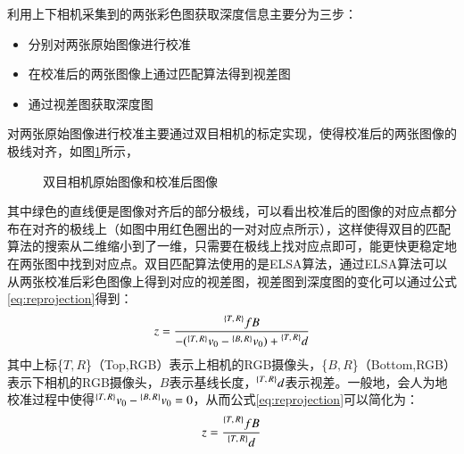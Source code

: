 利用上下相机采集到的两张彩色图获取深度信息主要分为三步：
\begin{itemize}
\item 分别对两张原始图像进行校准
\item 在校准后的两张图像上通过匹配算法得到视差图
\item 通过视差图获取深度图
\end{itemize}
对两张原始图像进行校准主要通过双目相机的标定实现，使得校准后的两张图像的极线对齐，如图\ref{fig:stereo_images}所示，
\begin{figure}[!ht]
  \centering
  \hfill
  \vfill
  \hfill
  \caption{双目相机原始图像和校准后图像}
  \label{fig:stereo_images}
\end{figure}
其中绿色的直线便是图像对齐后的部分极线，可以看出校准后的图像的对应点都分布在对齐的极线上（如图中用红色圈出的一对对应点所示），这样使得双目的匹配算法的搜索从二维缩小到了一维，只需要在极线上找对应点即可，能更快更稳定地在两张图中找到对应点。双目匹配算法使用的是ELSA算法\cite{Geiger2010}，通过ELSA算法可以从两张校准后彩色图像上得到对应的视差图，视差图到深度图的变化可以通过公式\ref{eq:reprojection}得到：
\begin{equation}
  \label{eq:reprojection}
  z = \frac{\prescript{\{T,\,R\}}{}{f}B}{-(\prescript{\{T,\,R\}}{}{v_0}-\prescript{\{B,\,R\}}{}{v_0}) + \prescript{\{T,\,R\}}{}{d}}
\end{equation}
其中上标\{$T,R$\}（Top,RGB）表示上相机的RGB摄像头，\{$B,R$\}（Bottom,RGB）表示下相机的RGB摄像头，$B$表示基线长度，$\prescript{\{T,\,R\}}{}{d}$表示视差。一般地，会人为地校准过程中使得$\prescript{\{T,\,R\}}{}{v_0}-\prescript{\{B,\,R\}}{}{v_0}=0$，从而公式\ref{eq:reprojection}可以简化为：
\begin{equation}
  \label{eq:reprojection_simple}
  z = \frac{\prescript{\{T,\,R\}}{}{f}B}{\prescript{\{T,\,R\}}{}{d}}
\end{equation}

